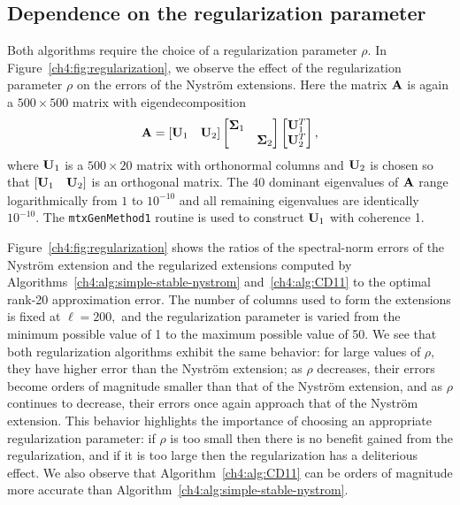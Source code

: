 \subsection*{Dependence on the regularization parameter}
Both algorithms require the choice of a regularization parameter
$\rho.$ In Figure~\ref{ch4:fig:regularization}, we observe the effect of the
regularization parameter $\rho$ on the errors of the Nystr\"om extensions. Here
the matrix $\mathbf{A}$ is again a $500 \times 500$ matrix with eigendecomposition
\begin{equation}
\mathbf{A} = [\begin{matrix} \mathbf{U}_1 & \mathbf{U}_2 \end{matrix}] 
 \left[ \begin{matrix} \mathbf{\Sigma}_1 & \\ & \mathbf{\Sigma}_2 \end{matrix} \right]
 \left[ \begin{matrix} \mathbf{U}_1^T \\ \mathbf{U}_2^T \end{matrix}
\right],
 \label{ch4:eqn:rhodependencematrix}
\end{equation}
where $\mathbf{U}_1$ is a $500 \times 20$ matrix with orthonormal columns and
$\mathbf{U}_2$ is chosen so that $[\begin{matrix} \mathbf{U}_1 & \mathbf{U}_2
\end{matrix}]$ is an orthogonal matrix. The 40 dominant eigenvalues of $\mathbf{A}$
range logarithmically from $1$ to $10^{-10}$ and all remaining eigenvalues are
identically $10^{-10}.$ The \texttt{mtxGenMethod1} routine is used to construct
$\mathbf{U}_1$ with coherence 1. 

Figure~\ref{ch4:fig:regularization} shows the ratios of the spectral-norm 
errors of the Nystr\"om extension and the regularized extensions
computed by Algorithms~\ref{ch4:alg:simple-stable-nystrom} and~\ref{ch4:alg:CD11}
to the optimal rank-20 approximation error. The
number of columns used to form the extensions is fixed at $\ell = 200,$ 
and the regularization parameter is varied from the minimum possible value of 
1 to the maximum possible value of 50. We see
that both regularization algorithms exhibit the same behavior: for large
values of $\rho,$ they have higher error than the Nystr\"om extension; as
$\rho$ decreases, their errors become orders of magnitude smaller than that of
the Nystr\"om extension, and as $\rho$ continues to decrease, their
errors once again approach that of the Nystr\"om extension. This behavior
highlights the importance of choosing an appropriate regularization parameter:
if $\rho$ is too small then there is no benefit gained from the regularization,
and if it is too large then the 
regularization has a deliterious effect. We also observe that Algorithm~\ref{ch4:alg:CD11}
can be orders of magnitude more accurate than Algorithm~\ref{ch4:alg:simple-stable-nystrom}.

